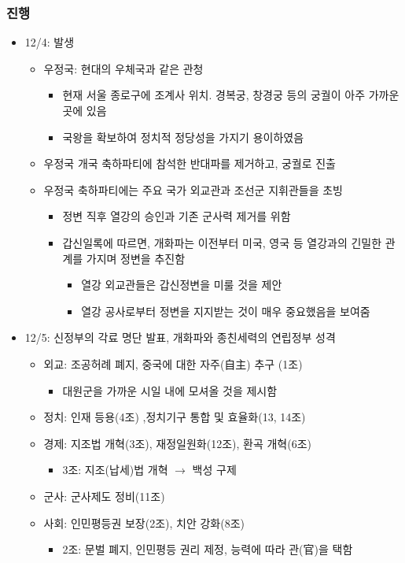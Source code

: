 \subsubsection*{진행}
\begin{itemize}
    \item 12/4: 발생
    \begin{itemize}
        \item 우정국: 현대의 우체국과 같은 관청
        \begin{itemize}
            \item 현재 서울 종로구에 조계사 위치. 경복궁, 창경궁 등의 궁궐이 아주 가까운 곳에 있음
            \item 국왕을 확보하여 정치적 정당성을 가지기 용이하였음
        \end{itemize}
        \item 우정국 개국 축하파티에 참석한 반대파를 제거하고, 궁궐로 진출
        \item 우정국 축하파티에는 주요 국가 외교관과 조선군 지휘관들을 초빙
        \begin{itemize}
            \item 정변 직후 열강의 승인과 기존 군사력 제거를 위함
            \item 갑신일록에 따르면, 개화파는 이전부터 미국, 영국 등 열강과의 긴밀한 관계를 가지며 정변을 추진함
            \begin{itemize}
                \item 열강 외교관들은 갑신정변을 미룰 것을 제안
                \item 열강 공사로부터 정변을 지지받는 것이 매우 중요했음을 보여줌
            \end{itemize}
        \end{itemize}
    \end{itemize}

    \item 12/5: 신정부의 각료 명단 발표, 개화파와 종친세력의 연립정부 성격
    \begin{itemize}
        \item 외교: 조공허례 폐지, 중국에 대한 자주(自主) 추구 (1조)
        \begin{itemize}
            \item 대원군을 가까운 시일 내에 모셔올 것을 제시함
        \end{itemize}
        \item 정치: 인재 등용(4조) ,정치기구 통합 및 효율화(13, 14조)
        \item 경제: 지조법 개혁(3조), 재정일원화(12조), 환곡 개혁(6조)
        \begin{itemize}
            \item 3조: 지조(납세)법 개혁 $\rightarrow$ 백성 구제
        \end{itemize}
        \item 군사: 군사제도 정비(11조)
        \item 사회: 인민평등권 보장(2조), 치안 강화(8조)
        \begin{itemize}
            \item 2조: 문벌 폐지, 인민평등 권리 제정, 능력에 따라 관(官)을 택함
        \end{itemize}
    \end{itemize}


\end{itemize}
